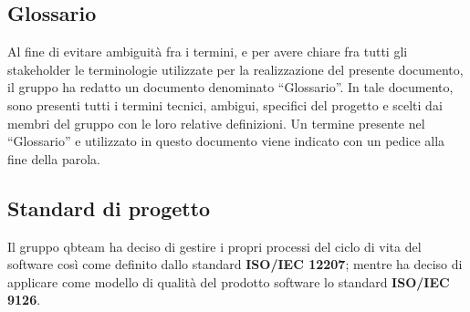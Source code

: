 \subsection{Glossario}
Al fine di evitare ambiguità fra i termini, e per avere chiare fra tutti gli stakeholder le terminologie utilizzate per la realizzazione del presente documento, il gruppo \Gruppo{} ha redatto un documento denominato “Glossario”.
In tale documento, sono presenti tutti i termini tecnici, ambigui, specifici del progetto e scelti dai membri del gruppo con le loro relative definizioni.
Un termine presente nel “Glossario” e utilizzato in questo documento viene indicato con un pedice  alla fine della parola.

\subsection{Standard di progetto}
Il gruppo qbteam ha deciso di gestire i propri processi del ciclo di vita del software così come definito dallo standard \textbf{ISO/IEC 12207}; 
mentre ha deciso di applicare come modello di qualità del prodotto software lo standard \textbf{ISO/IEC 9126}.
